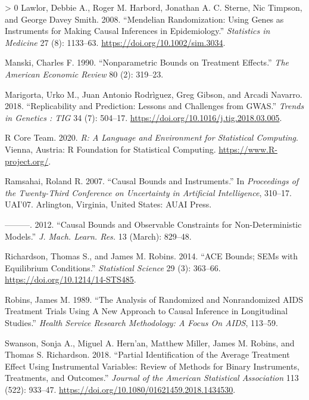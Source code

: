 \documentclass[
]{article}
\theoremstyle{plain}
\newlength{\cslhangindent}
\newenvironment{CSLReferences}[3] %
 {%
  \setlength{\parindent}{0pt}
  \ifodd #1 \everypar{\setlength{\hangindent}{\cslhangindent}}\ignorespaces\fi
  \ifnum #2 > 0
  \setlength{\parskip}{#2\baselineskip}
  \fi
 }%
 {}
\begin{document}
\begin{CSLReferences}{1}{0}
\leavevmode\hypertarget{ref-lawlor_mendelian_2008}{}%
Lawlor, Debbie A., Roger M. Harbord, Jonathan A. C. Sterne, Nic Timpson, and George Davey Smith. 2008. {``Mendelian Randomization: Using Genes as Instruments for Making Causal Inferences in Epidemiology.''} \emph{Statistics in Medicine} 27 (8): 1133--63. \url{https://doi.org/10.1002/sim.3034}.

\leavevmode\hypertarget{ref-manski_nonparametric_1990}{}%
Manski, Charles F. 1990. {``Nonparametric {Bounds} on {Treatment Effects}.''} \emph{The American Economic Review} 80 (2): 319--23.

\leavevmode\hypertarget{ref-marigorta_replicability_2018}{}%
Marigorta, Urko M., Juan Antonio Rodrìguez, Greg Gibson, and Arcadi Navarro. 2018. {``Replicability and {Prediction}: Lessons and Challenges from {GWAS}.''} \emph{Trends in Genetics : TIG} 34 (7): 504--17. \url{https://doi.org/10.1016/j.tig.2018.03.005}.

\leavevmode\hypertarget{ref-R}{}%
R Core Team. 2020. \emph{R: A Language and Environment for Statistical Computing}. Vienna, Austria: R Foundation for Statistical Computing. \url{https://www.R-project.org/}.

\leavevmode\hypertarget{ref-ramsahai_causal_2007}{}%
Ramsahai, Roland R. 2007. {``Causal {Bounds} and {Instruments}.''} In \emph{Proceedings of the {Twenty}-{Third Conference} on {Uncertainty} in {Artificial Intelligence}}, 310--17. {UAI}'07. {Arlington, Virginia, United States}: {AUAI Press}.

\leavevmode\hypertarget{ref-ramsahai_causal_2012}{}%
---------. 2012. {``Causal {Bounds} and {Observable Constraints} for {Non}-Deterministic {Models}.''} \emph{J. Mach. Learn. Res.} 13 (March): 829--48.

\leavevmode\hypertarget{ref-richardson_ace_2014}{}%
Richardson, Thomas S., and James M. Robins. 2014. {``{ACE Bounds}; {SEMs} with {Equilibrium Conditions}.''} \emph{Statistical Science} 29 (3): 363--66. \url{https://doi.org/10.1214/14-STS485}.

\leavevmode\hypertarget{ref-robins_analysis_1989}{}%
Robins, James M. 1989. {``The {Analysis} of {Randomized} and {Nonrandomized AIDS Treatment Trials Using A New Approach} to {Causal Inference} in {Longitudinal Studies}.''} \emph{Health Service Research Methodology: A Focus On AIDS}, 113--59.

\leavevmode\hypertarget{ref-swanson_partial_2018}{}%
Swanson, Sonja A., Miguel A. Hern'an, Matthew Miller, James M. Robins, and Thomas S. Richardson. 2018. {``Partial {Identification} of the {Average Treatment Effect Using Instrumental Variables}: {Review} of {Methods} for {Binary Instruments}, {Treatments}, and {Outcomes}.''} \emph{Journal of the American Statistical Association} 113 (522): 933--47. \url{https://doi.org/10.1080/01621459.2018.1434530}.


\end{CSLReferences}
\end{document}
